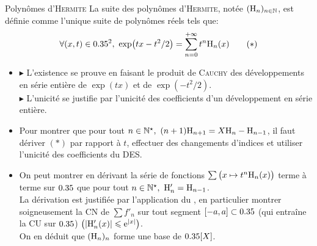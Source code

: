 \begin{defi}{Polynômes d'\textsc{Hermite}}
    La suite des polynômes d'\textsc{Hermite}, notée $(\mathrm{H}_n)_{n \in \mathbb{N}}$, est définie comme l'unique suite de polynômes réels tels que:
    $$\forall(x, t) \in 0.35^2,\ \exp(tx-t^2/2) = \sum_{n=0}^{+\infty} t^n \mathrm{H}_n(x) \qquad (*)$$
\end{defi}

\begin{preuve}
    \begin{itemize}
    \item $\blacktriangleright$ L'existence se prouve en faisant le produit de \textsc{Cauchy} des développements en série entière de $\exp(tx)$ et de $\exp(-t^2/2)$.\\
    $\blacktriangleright$ L'unicité se justifie par l'unicité des coefficients d'un développement en série entière. 
    \item Pour montrer que pour tout $n \in \Ne,\ (n+1)\Hermite_{n+1}=X\Hermite_n-\Hermite_{n-1}$, il faut dériver $(*)$ par rapport à $t$, effectuer des changements d'indices et utiliser l'unicité des coefficients du DES. 
    \item On peut montrer en dérivant  la série de fonctions $\sum \big(x \mapsto t^n \mathrm{H}_n(x) \big)$ terme à terme sur $0.35$ que pour tout $n \in \Ne,\ \Hermite'_n=\Hermite_{n-1}$.\\
    La dérivation est justifiée par l'application du , en particulier montrer soigneusement la CN de $\sum f'_n$ sur tout segment $[-a, a] \subset 0.35$ (qui entraîne la CU sur $0.35$) $\left(|\mathrm{H}'_n(x)| \leqslant \mathrm{e}^{|x|} \right)$.\\
    On en déduit que $(\mathrm{H}_n)_n$ forme une base de $0.35[X]$.\\
    \end{itemize}
\end{preuve}
